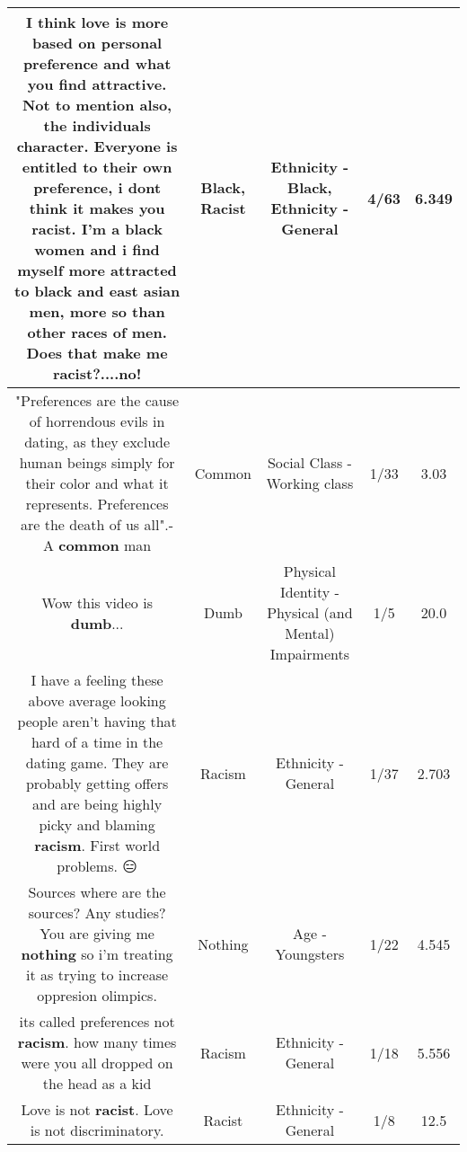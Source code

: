 \documentclass[11pt]{article}
\newlength\mylength
\begin{document}
\begin{center}
\begin{longtable}{|C{.65\mylength}|C{.30\mylength}|C{.12\mylength}|C{.12\mylength}|C{.12\mylength}|}
  \small I think love is more based on personal preference and what you find attractive. Not to mention also, the individuals character. Everyone is entitled to their own preference, i dont think it makes you \textbf{racist}. I'm a \textbf{black} women and i find myself more attracted to \textbf{black} and east asian men, more so than other races of men. Does that make me \textbf{racist}?....no!\normalsize   & Black, Racist & Ethnicity - Black, Ethnicity - General & 4/63 & 6.349 \\  \hline
  \small "Preferences are the cause of horrendous evils in dating, as they exclude human beings simply for their color and what it represents. Preferences are the death of us all".- A \textbf{common} man\normalsize   & Common & Social Class - Working class & 1/33 & 3.03 \\  \hline
  \small Wow this video is \textbf{dumb}...\normalsize   & Dumb & Physical Identity - Physical (and Mental) Impairments & 1/5 & 20.0 \\  \hline
  \small I have a feeling these above average looking people aren't having that hard of a time in the dating game. They are probably getting offers and are being highly picky and blaming \textbf{racism}. First world problems. 😑\normalsize   & Racism & Ethnicity - General & 1/37 & 2.703 \\  \hline
  \small Sources where are the sources? Any studies? You are giving me \textbf{nothing} so i'm treating it as trying to increase oppresion olimpics.\normalsize   & Nothing & Age - Youngsters & 1/22 & 4.545 \\  \hline
  \small its called preferences not \textbf{racism}. how many times were you all dropped on the head as a kid\normalsize   & Racism & Ethnicity - General & 1/18 & 5.556 \\  \hline
  \small Love is not \textbf{racist}. Love is not discriminatory.\normalsize   & Racist & Ethnicity - General & 1/8 & 12.5 \\  \hline

\end{longtable}
\end{center}
\end{document}
